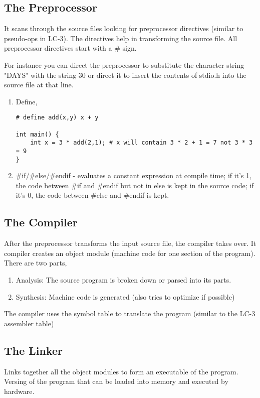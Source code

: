 \subsection{The Preprocessor}
It scans through the source files looking for preprocessor directives (similar to pseudo-ops in LC-3). The directives help in transforming the source file. All preprocessor directives start with a $\#$ sign.

For instance you can direct the preprocessor to substitute the character string "DAYS" with the string $30$ or direct it to insert the contents of stdio.h into the source file at that line.


\begin{enumerate}
    \item Define,
\begin{verbatim}
# define add(x,y) x + y

int main() {
    int x = 3 * add(2,1); # x will contain 3 * 2 + 1 = 7 not 3 * 3 = 9
}
\end{verbatim}
\item \#if/\#else/\#endif - evaluates a constant expression at compile time; if it's 1, the code between \#if and \#endif but not in else is kept in the source code; if it's 0, the code between \#else and \#endif is kept.
\end{enumerate}
\subsection{The Compiler}
After the preprocessor transforms the input source file, the compiler takes over. It compiler creates an object module (machine code for one section of the program). There are two parts,
\begin{enumerate}
    \item Analysis: The source program is broken down or parsed into its parts.
    \item Synthesis: Machine code is generated (also tries to optimize if possible)
\end{enumerate}

The compiler uses the symbol table to translate the program (similar to the LC-3 assembler table)

\subsection{The Linker}
Links together all the object modules to form an executable of the program. Versing of the program that can be loaded into memory and executed by hardware.


